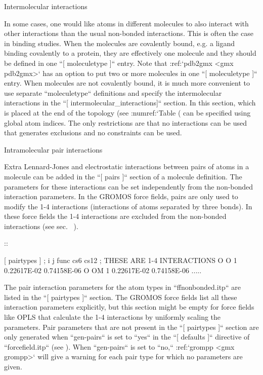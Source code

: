 Intermolecular interactions
~~~~~~~~~~~~~~~~~~~~~~~~~~~

In some cases, one would like atoms in different molecules to also
interact with other interactions than the usual non-bonded interactions.
This is often the case in binding studies. When the molecules are
covalently bound, e.g. a ligand binding covalently to a protein, they
are effectively one molecule and they should be defined in one
``[ moleculetype ]`` entry. Note that
:ref:`pdb2gmx <gmx pdb2gmx>` has an option to put two or more molecules in
one ``[ moleculetype ]`` entry. When molecules are not
covalently bound, it is much more convenient to use separate
``moleculetype`` definitions and specify the intermolecular
interactions in the ``[ intermolecular_interactions]``
section. In this section, which is placed at the end of the topology
(see :numref:`Table (%
can be specified using global atom indices. The only restrictions are
that no interactions can be used that generates exclusions and no
constraints can be used.

Intramolecular pair interactions
~~~~~~~~~~~~~~~~~~~~~~~~~~~~~~~~

Extra Lennard-Jones and electrostatic interactions between pairs of
atoms in a molecule can be added in the ``[ pairs ]``
section of a molecule definition. The parameters for these interactions
can be set independently from the non-bonded interaction parameters. In
the GROMOS force fields, pairs are only used to modify the 1-4
interactions (interactions of atoms
separated by three bonds). In these force fields the 1-4 interactions
are excluded from the non-bonded interactions (see
sec. 
).

::


    [ pairtypes ]
      ; i    j func         cs6          cs12 ; THESE ARE 1-4 INTERACTIONS
        O    O    1 0.22617E-02   0.74158E-06
        O   OM    1 0.22617E-02   0.74158E-06
        .....

The pair interaction parameters for the atom types in
``ffnonbonded.itp`` are listed in the
``[ pairtypes ]`` section. The GROMOS force fields list all
these interaction parameters explicitly, but this section might be empty
for force fields like OPLS that calculate the 1-4
interactions 
by uniformly scaling
the parameters. Pair parameters that are not present in the
``[ pairtypes ]`` section are only generated when
``gen-pairs`` is set to ``yes`` in the
``[ defaults ]`` directive of ``forcefield.itp``
(see 
). When ``gen-pairs``
is set to ``no,`` :ref:`grompp <gmx grompp>` will
give a warning for each pair type for which no parameters are given.

